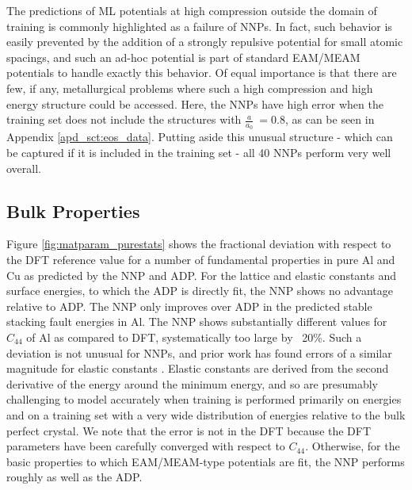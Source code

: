 \documentclass{article}
\begin{document}
The predictions of ML potentials at high compression outside the domain of training is commonly highlighted as a failure of NNPs.
In fact, such behavior is easily prevented by the addition of a strongly repulsive potential for small atomic spacings, and such an ad-hoc potential is part of standard EAM/MEAM potentials to handle exactly this behavior.
Of equal importance is that there are few, if any, metallurgical problems where such a high compression and high energy structure could be accessed.  Here, the NNPs have high error when the training set does not include the structures with $\frac{a}{a_0} ~= 0.8$, as can be seen in Appendix \ref{apd_sct:eos_data}. Putting aside this unusual structure - which can be captured if it is included in the training set - all 40 NNPs perform very well overall.


\subsection{Bulk Properties} \label{sct:bulk_properties}

Figure \ref{fig:matparam_purestats} shows the fractional deviation with respect to the DFT reference value for a number of fundamental properties in pure Al and Cu as predicted by the NNP and ADP.  For the lattice and elastic constants and surface energies, to which the ADP is directly fit, the NNP shows no advantage relative to ADP. The NNP only improves over ADP in the predicted stable stacking fault energies in Al.
The NNP shows substantially different values for $C_{44}$ of Al as compared to DFT, systematically too large by ~20\%.  Such a deviation is not unusual for NNPs, and prior work has found errors of a similar magnitude for elastic constants \cite{Zuo2020APotentials}.
Elastic constants are derived from the second derivative of the energy around the minimum energy, and so are presumably challenging to model accurately
when training is performed primarily on energies and on a training set with a very wide distribution of energies relative to the bulk perfect crystal.  
We note that the error is not in the DFT because the DFT parameters have been carefully converged with respect to $C_{44}$.  Otherwise, for the basic properties to which EAM/MEAM-type potentials are fit, the NNP performs roughly as well as the ADP.
\end{document}
